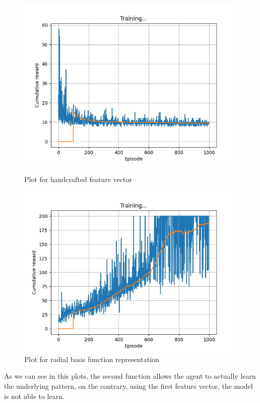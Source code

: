 \documentclass[12pt]{article}
\begin{document}
\begin{figure}[H]
    \centering
   \begin{minipage}{0.48\textwidth}
     \centering
     \includegraphics[width=0.9\linewidth]{exercise-4/plots/task-1a.png}
     \caption{Plot for handcrafted feature vector}
     \label{fig:task-2-1}
   \end{minipage}\hfill
   \begin{minipage}{0.48\textwidth}
     \centering
     \includegraphics[width=0.9\linewidth]{exercise-4/plots/task-1b.png}
     \caption{Plot for radial basis function representation}
     \label{fig:task-2-2}
   \end{minipage}
\end{figure}

As we can see in this plots, the second function allows the agent to actually learn the underlying pattern, on the contrary, using the first feature vector, the model is not able to learn. 
\end{document}
